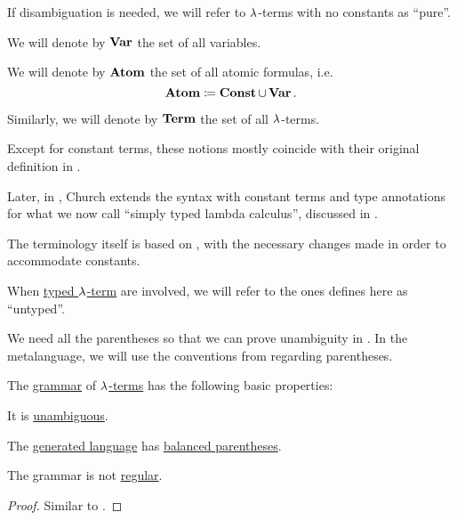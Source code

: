 \begin{definition}
\begin{thmenum}
    If disambiguation is needed, we will refer to \( {\mathrm \lambda} \)-terms with no constants as \enquote{pure}.

     We will denote by \( \op*{Var} \) the set of all variables.

     We will denote by \( \op*{Atom} \) the set of all atomic formulas, i.e.
    \begin{equation*}
      \op*{Atom} \coloneqq \op*{Const} \cup \op*{Var}.
    \end{equation*}

     Similarly, we will denote by \( \op*{Term} \) the set of all \( {\mathrm \lambda} \)-terms.
  \end{thmenum}
\end{definition}
\begin{comments}
  \item Except for constant terms, these notions mostly coincide with their original definition in \cite[352]{Church1932LambdaCalculus}.

  Later, in \cite[56]{Church1940STT}, Church extends the syntax with constant terms and type annotations for what we now call \enquote{simply typed lambda calculus}, discussed in .

  The terminology itself is based on \cite[def. 1A1]{Hindley1997BasicSTT}, with the necessary changes made in order to accommodate constants.

  \item When \hyperref[def:typed_lambda_term]{typed \( {\mathrm \lambda} \)-term} are involved, we will refer to the ones defines here as \enquote{untyped}.

  \item We need all the parentheses so that we can prove unambiguity in . In the metalanguage, we will use the conventions from  regarding parentheses.
\end{comments}

\begin{proposition}\label{thm:lambda_term_grammar}
  The \hyperref[def:formal_grammar]{grammar} of \hyperref[def:lambda_term]{\( {\mathrm \lambda} \)-terms} has the following basic properties:
  \begin{thmenum}
     It is \hyperref[def:grammar_ambiguity]{unambiguous}.

     The \hyperref[def:formal_grammar/language]{generated language} has \hyperref[def:paired_delimiters]{balanced parentheses}.

     The grammar is not \hyperref[def:chomsky_hierarchy/regular]{regular}.
  \end{thmenum}
\end{proposition}
\begin{proof}
  Similar to .
\end{proof}

